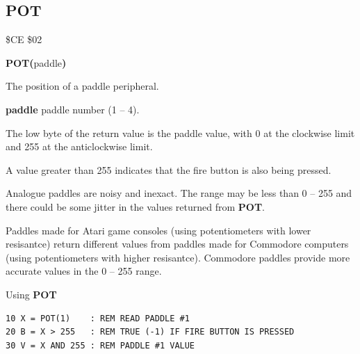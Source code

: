 \subsection{POT}
\begin{description}[leftmargin=2cm,style=nextline]
\item [Token:]    \$CE \$02

\item [Format:]   {\bf POT(}paddle{\bf)}

\item [Returns:]  The position of a paddle peripheral.

                  {\bf paddle} paddle number (1 -- 4).

                  The low byte of the return value is the paddle value, with 0 at the clockwise limit and 255 at the anticlockwise limit.

                  A value greater than 255 indicates that the fire button is also being pressed.

\item [Remarks:]  Analogue paddles are noisy and inexact. The range may be less than 0 -- 255 and there could be some jitter in the values returned from {\bf POT}.

                  Paddles made for Atari game consoles (using potentiometers with lower resisantce) return different values from paddles made for Commodore computers (using potentiometers with higher resisantce). Commodore paddles provide more accurate values in the 0 -- 255 range.

\item [Example:]  Using {\bf POT}

\begin{tcolorbox}[colback=black,coltext=white]
\verbatimfont{\codefont}
\begin{verbatim}
10 X = POT(1)    : REM READ PADDLE #1
20 B = X > 255   : REM TRUE (-1) IF FIRE BUTTON IS PRESSED
30 V = X AND 255 : REM PADDLE #1 VALUE
\end{verbatim}
\end{tcolorbox}
\end{description}


\newpage
